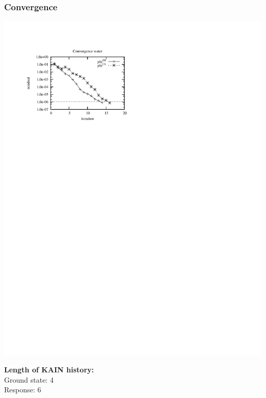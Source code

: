 \begin{frame}
    \frametitle{Convergence}
    \begin{center}
	\includegraphics[scale=1.0, clip, viewport = 50 550 300 730]{figures/response_convergence.pdf}
    \end{center}

    \centering
    \textbf{Length of KAIN history:}\\
    Ground state: 4\\
    Response: 6\\
\end{frame}

